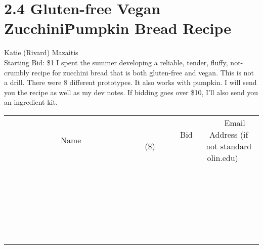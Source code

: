 \documentclass[11pt]{article}
\begin{document}
\section*{2.4 Gluten-free Vegan Zucchini\^Pumpkin Bread Recipe}
Katie (Rivard) Mazaitis
\\
Starting Bid: \$1
\newline
I spent the summer developing a reliable, tender, fluffy, not-crumbly recipe for zucchini bread that is both gluten-free and vegan. This is not a drill. There were 8 different prototypes. It also works with pumpkin. I will send you the recipe as well as my dev notes. If bidding goes over \$10, I'll also send you an ingredient kit.
\\[6ex]
\begin{tabular}{c c c}
~~~~~~~~~~~~~Name~~~~~~~~~~~~~ & ~~~~~~~~~Bid (\$)~~~~~~~~~  & ~~~Email Address (if not standard olin.edu)~~~\\
 & & \\
\hline
 & & \\
\hline
 & & \\
\hline
 & & \\
\hline
 & & \\
\hline
 & & \\
\hline
 & & \\
\hline
 & & \\
\hline
 & & \\
\hline
 & & \\
\hline
 & & \\
\hline
 & & \\
\hline
 & & \\
\hline
 & & \\
\hline
 & & \\
\hline
 & & \\
\hline
 & & \\
\hline
 & & \\
\hline
 & & \\
\hline
 & & \\
\hline
 & & \\
\hline
 & & \\
\hline
 & & \\
\hline
 & & \\
\hline
 & & \\
\hline
 & & \\
\hline
\end{tabular}
\newpage
\end{document}
